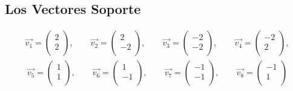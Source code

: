 \documentclass[fleqn]{llncs}
\begin{document}
\newpage

\subsection{Los Vectores Soporte}
\begin{align*}
	\overrightarrow{v_1} =
	\begin{pmatrix}
		2 \\
		2 \\
	\end{pmatrix},
	\qquad
	\overrightarrow{v_2} =
	\begin{pmatrix}
		2 \\
		-2 \\
	\end{pmatrix},
	\qquad
	\overrightarrow{v_3} =
	\begin{pmatrix}
		-2 \\
		-2 \\
	\end{pmatrix},
	\qquad
	\overrightarrow{v_4} =
	\begin{pmatrix}
		-2 \\
		2 \\
	\end{pmatrix},
\end{align*}
\begin{align*}
	\overrightarrow{v_5} =
	\begin{pmatrix}
		1 \\
		1 \\
	\end{pmatrix},
	\qquad
	\overrightarrow{v_6} =
	\begin{pmatrix}
		1 \\
		-1 \\
	\end{pmatrix},
	\qquad
	\overrightarrow{v_7} =
	\begin{pmatrix}
		-1 \\
		-1 \\
	\end{pmatrix},
	\qquad
	\overrightarrow{v_8} =
	\begin{pmatrix}
		-1 \\
		1 \\
	\end{pmatrix}
\end{align*}
\end{document}
